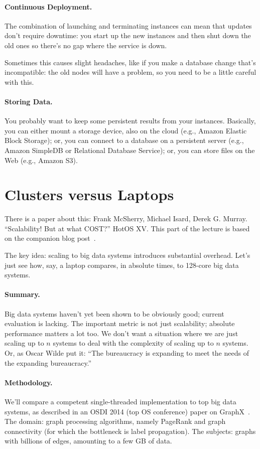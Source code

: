 \paragraph{Continuous Deployment.} The combination of launching and terminating instances can mean that updates don't require downtime: you start up the new instances and then shut down the old ones so there's no gap where the service is down.

Sometimes this causes slight headaches, like if you make a database change that's incompatible: the old nodes will have a problem, so you need to be a little careful with this.

\paragraph{Storing Data.} You probably want to keep some persistent results
from your instances. Basically, you can either mount a storage device,
also on the cloud (e.g., Amazon Elastic Block Storage); or, you can
connect to a database on a persistent server (e.g., Amazon SimpleDB or
Relational Database Service); or, you can store files on the Web
(e.g., Amazon S3). 


\section*{Clusters versus Laptops}
There is a paper about this: Frank McSherry, Michael Isard, Derek G. Murray. ``Scalability! But at what COST?'' HotOS XV. This part of the lecture is based on the companion blog post~\cite{scalecost}.

The key idea: scaling to big data systems introduces substantial overhead. Let's just see how, say, a laptop compares, in absolute times, to 128-core big data systems.

\paragraph{Summary.} Big data systems haven't yet been shown to be obviously good; current evaluation is lacking.
The important metric is not just scalability; absolute
performance matters a lot too. We don't want a situation where we are just scaling up to $n$ systems to deal with the complexity of scaling up to $n$ systems. Or, as Oscar Wilde put it: ``The bureaucracy is expanding to meet the needs of the expanding bureaucracy.''

\paragraph{Methodology.} We'll compare a competent single-threaded implementation to top
big data systems, as described in an OSDI 2014 (top OS conference) paper on GraphX~\cite{graphx}. The domain: graph processing
algorithms, namely PageRank and graph connectivity (for which the bottleneck is label propagation). The subjects: graphs with billions of edges, amounting to a few
GB of data.

